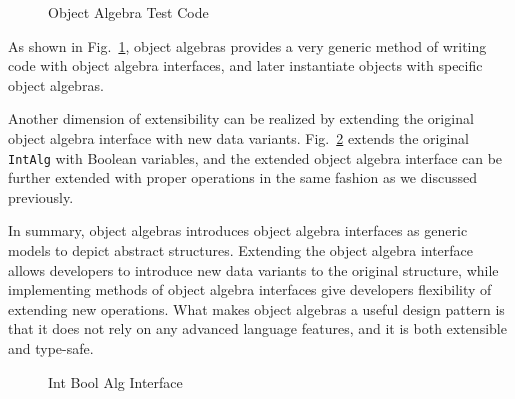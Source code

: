 \begin{figure}[t]
\nocaptionrule
\caption{Object Algebra Test Code}
\label{oa_test_code}
\end{figure}

As shown in Fig.~\ref{oa_test_code}, object algebras provides a very generic method of writing code with object algebra interfaces, and later instantiate objects with specific object algebras. 

Another dimension of extensibility can be realized by extending the original object algebra interface with new data variants. Fig.~\ref{int_bool_alg_interface} extends the original \lstinline{IntAlg} with Boolean variables, and the extended object algebra interface can be further extended with proper operations in the same fashion as we discussed previously. 

In summary, object algebras introduces object algebra interfaces as generic models to depict abstract structures. Extending the object algebra interface allows developers to introduce new data variants to the original structure, while implementing methods of object algebra interfaces give developers flexibility of extending new operations. What makes object algebras a useful design pattern is that it does not rely on any advanced language features, and it is both extensible and type-safe. 

\begin{figure}[t]
\nocaptionrule
\caption{Int Bool Alg Interface}
\label{int_bool_alg_interface}
\end{figure}

\begin{comment}

This paper showed how various types of traversals for complex
structures can be automatically provided by \Name. \name traversals are
written directly in Java and are type-safe, extensible and separately
compilable. There has always been a tension between the 
correctness guarantees of static typing, and the flexibility of
untyped/dynamically-typed approaches. \name shows that even
in type systems like Java's, it is possible to get considerable
flexibility and adaptability for the problem of boilerplate code in
traversals of complex structures, without giving up modular static typing. 

There are many of avenues for future work. One area of research is to
extend \name traversals to support flexible traversal strategies,
similarly to strategic
programming~\cite{borovansky1996elan,visser1998core,vandenBrand:2003:TRT:941566.941568}. Another
line of work worth exploring is to adopt generalizations of object
algebras~\cite{oliveira13fop} for added expressiveness of \name
traversals.

\end{comment}